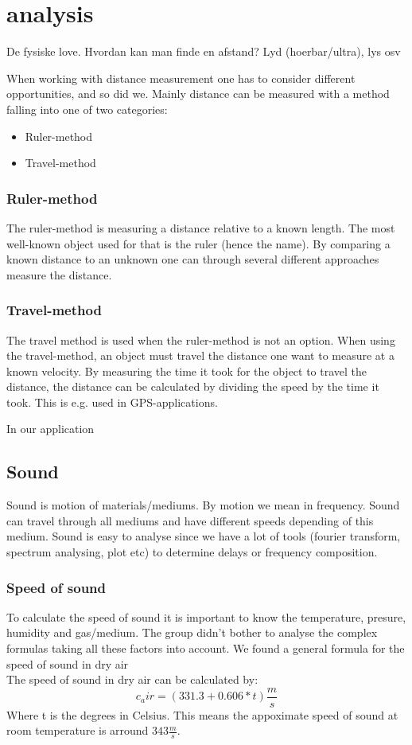 \chapter{analysis}
De fysiske love. Hvordan kan man finde en afstand? Lyd (hoerbar/ultra), lys osv

When working with distance measurement one has to consider different opportunities, and so did we.
Mainly distance can be measured with a method falling into one of two categories:
\begin{itemize}
\item Ruler-method
\item Travel-method
\end{itemize}

\subsection{Ruler-method}
The ruler-method is measuring a distance relative to a known length. The most well-known object used for that is the ruler (hence the name). By comparing a known distance to an unknown one can through several different approaches measure the distance.

\subsection{Travel-method}
The travel method is used when the ruler-method is not an option. When using the travel-method, an object must travel the distance one want to measure at a known velocity. By measuring the time it took for the object to travel the distance, the distance can be calculated by dividing the speed by the time it took. This is e.g. used in GPS-applications.

In our application 

\section{Sound}
Sound is motion of materials/mediums. By motion we mean in frequency. Sound can travel through all mediums and have different speeds depending of this medium. Sound is easy to analyse since we have a lot of tools (fourier transform, spectrum analysing, plot etc) to determine delays or frequency composition.

\subsection{Speed of sound}
To calculate the speed of sound it is important to know the temperature, presure, humidity and gas/medium. The group didn't bother to analyse the complex formulas taking all these factors into account. We found a general formula for the speed of sound in dry air\\
The speed of sound in dry air can be calculated by:
\begin{equation}
c_air=(331.3+0.606*t)\frac{m}{s}
\end{equation}
Where t is the degrees in Celsius. This means the appoximate speed of sound at room temperature is arround $343\frac{m}{s}$.\\

